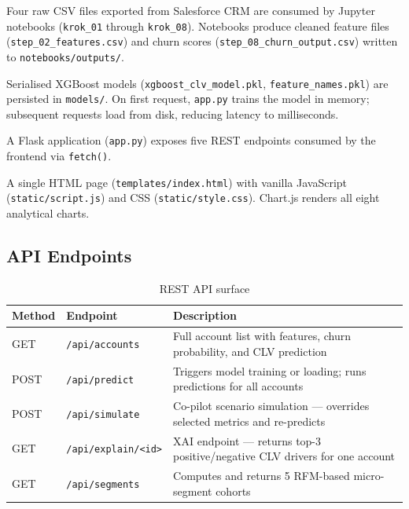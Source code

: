 \documentclass[11pt,a4paper]{article}
\begin{document}
\begin{description}[leftmargin=1.5cm, labelwidth=2.8cm]
  \item[\textbf{Data Layer}]
    Four raw CSV files exported from Salesforce CRM are consumed by
    Jupyter notebooks (\texttt{krok\_01} through \texttt{krok\_08}).
    Notebooks produce cleaned feature files (\texttt{step\_02\_features.csv})
    and churn scores (\texttt{step\_08\_churn\_output.csv}) written to
    \texttt{notebooks/outputs/}.

  \item[\textbf{Model Layer}]
    Serialised XGBoost models (\texttt{xgboost\_clv\_model.pkl},
    \texttt{feature\_names.pkl}) are persisted in \texttt{models/}.
    On first request, \texttt{app.py} trains the model in memory; subsequent
    requests load from disk, reducing latency to milliseconds.

  \item[\textbf{API Layer}]
    A Flask application (\texttt{app.py}) exposes five REST endpoints
    consumed by the frontend via \texttt{fetch()}.

  \item[\textbf{Frontend Layer}]
    A single HTML page (\texttt{templates/index.html}) with vanilla
    JavaScript (\texttt{static/script.js}) and CSS (\texttt{static/style.css}).
    Chart.js renders all eight analytical charts.
\end{description}

\subsection{API Endpoints}

\begin{table}[H]
\centering
\small
\begin{tabular}{lp{3.5cm}p{6cm}}
\toprule
\textbf{Method} & \textbf{Endpoint} & \textbf{Description} \\
\midrule
GET  & \texttt{/api/accounts}      & Full account list with features, churn probability, and CLV prediction \\
POST & \texttt{/api/predict}        & Triggers model training or loading; runs predictions for all accounts \\
POST & \texttt{/api/simulate}       & Co-pilot scenario simulation — overrides selected metrics and re-predicts \\
GET  & \texttt{/api/explain/<id>}   & XAI endpoint — returns top-3 positive/negative CLV drivers for one account \\
GET  & \texttt{/api/segments}       & Computes and returns 5 RFM-based micro-segment cohorts \\
\bottomrule
\end{tabular}
\caption{REST API surface}
\end{table}
\end{document}
